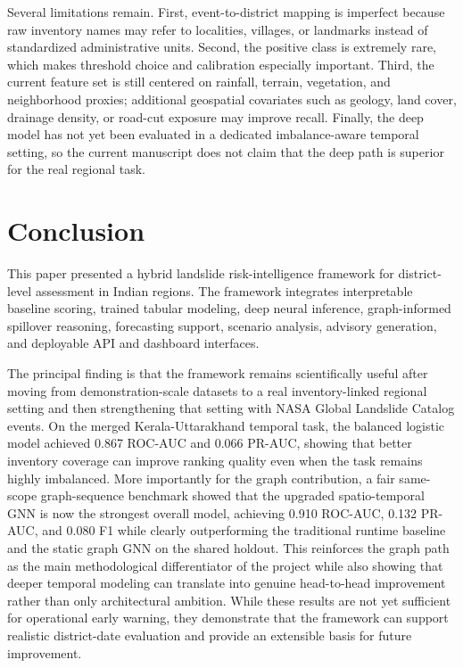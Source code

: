 \documentclass[pdflatex,sn-mathphys-num]{sn-jnl}
\begin{document}
Several limitations remain. First, event-to-district mapping is imperfect because raw inventory names may refer to localities, villages, or landmarks instead of standardized administrative units. Second, the positive class is extremely rare, which makes threshold choice and calibration especially important. Third, the current feature set is still centered on rainfall, terrain, vegetation, and neighborhood proxies; additional geospatial covariates such as geology, land cover, drainage density, or road-cut exposure may improve recall. Finally, the deep model has not yet been evaluated in a dedicated imbalance-aware temporal setting, so the current manuscript does not claim that the deep path is superior for the real regional task.

\section{Conclusion}

This paper presented a hybrid landslide risk-intelligence framework for district-level assessment in Indian regions. The framework integrates interpretable baseline scoring, trained tabular modeling, deep neural inference, graph-informed spillover reasoning, forecasting support, scenario analysis, advisory generation, and deployable API and dashboard interfaces.

The principal finding is that the framework remains scientifically useful after moving from demonstration-scale datasets to a real inventory-linked regional setting and then strengthening that setting with NASA Global Landslide Catalog events. On the merged Kerala-Uttarakhand temporal task, the balanced logistic model achieved 0.867 ROC-AUC and 0.066 PR-AUC, showing that better inventory coverage can improve ranking quality even when the task remains highly imbalanced. More importantly for the graph contribution, a fair same-scope graph-sequence benchmark showed that the upgraded spatio-temporal GNN is now the strongest overall model, achieving 0.910 ROC-AUC, 0.132 PR-AUC, and 0.080 F1 while clearly outperforming the traditional runtime baseline and the static graph GNN on the shared holdout. This reinforces the graph path as the main methodological differentiator of the project while also showing that deeper temporal modeling can translate into genuine head-to-head improvement rather than only architectural ambition. While these results are not yet sufficient for operational early warning, they demonstrate that the framework can support realistic district-date evaluation and provide an extensible basis for future improvement.
\end{document}
